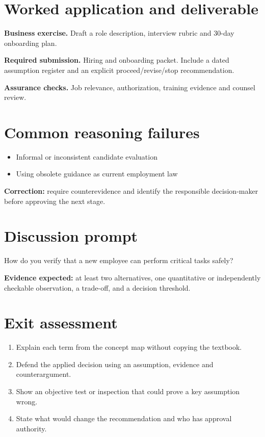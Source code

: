 \documentclass[11pt,letterpaper]{article}
\begin{document}
\section{Worked application and deliverable}
\textbf{Business exercise.} Draft a role description, interview rubric and 30-day onboarding plan.\par\textbf{Required submission.} Hiring and onboarding packet. Include a dated assumption register and an explicit proceed/revise/stop recommendation.\par\textbf{Assurance checks.} Job relevance, authorization, training evidence and counsel review.
\section{Common reasoning failures}
\begin{itemize}[leftmargin=*,itemsep=3pt]
\item Informal or inconsistent candidate evaluation
\item Using obsolete guidance as current employment law
\end{itemize}
\noindent\textbf{Correction:} require counterevidence and identify the responsible decision-maker before approving the next stage.
\section{Discussion prompt}
How do you verify that a new employee can perform critical tasks safely?\par\medskip\textbf{Evidence expected:} at least two alternatives, one quantitative or independently checkable observation, a trade-off, and a decision threshold.
\section{Exit assessment}
\begin{enumerate}[leftmargin=*,itemsep=5pt]
\item Explain each term from the concept map without copying the textbook.
\item Defend the applied decision using an assumption, evidence and counterargument.
\item Show an objective test or inspection that could prove a key assumption wrong.
\item State what would change the recommendation and who has approval authority.
\end{enumerate}

\end{document}
